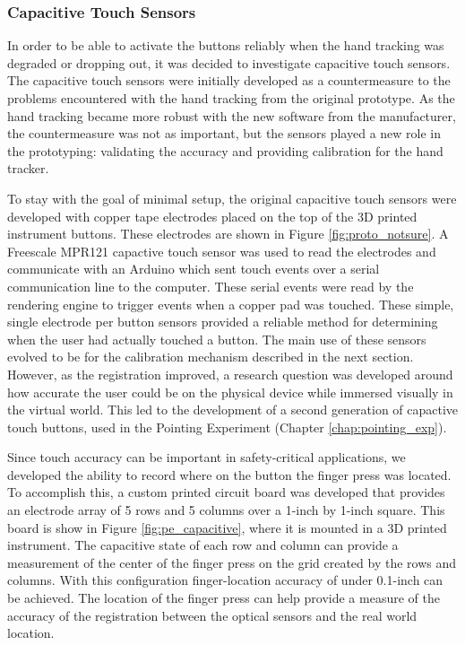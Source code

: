 \subsubsection{Capacitive Touch Sensors}

In order to be able to activate the buttons reliably when the hand tracking was degraded or dropping out, it was decided to investigate capacitive touch sensors.
The capacitive touch sensors were initially developed as a countermeasure to the problems encountered with the hand tracking from the original prototype.
As the hand tracking became more robust with the new software from the manufacturer, the countermeasure was not as important, but the sensors played a new role in the prototyping: validating the accuracy and providing calibration for the hand tracker.

To stay with the goal of minimal setup, the original capacitive touch sensors were developed with copper tape electrodes placed on the top of the 3D printed instrument buttons.
These electrodes are shown in Figure \ref{fig:proto_notsure}.
A Freescale MPR121 capactive touch sensor was used to read the electrodes and communicate with an Arduino which sent touch events over a serial communication line to the computer.
These serial events were read by the rendering engine to trigger events when a copper pad was touched.
These simple, single electrode per button sensors provided a reliable method for determining when the user had actually touched a button.
The main use of these sensors evolved to be for the calibration mechanism described in the next section.
However, as the registration improved, a research question was developed around how accurate the user could be on the physical device while immersed visually in the virtual world.
This led to the development of a second generation of capactive touch buttons, used in the Pointing Experiment (Chapter \ref{chap:pointing_exp}).

Since touch accuracy can be important in safety-critical applications, we developed the ability to record where on the button the finger press was located.
To accomplish this, a custom printed circuit board was developed that provides an electrode array of 5 rows and 5 columns over a 1-inch by 1-inch square.
This board is show in Figure \ref{fig:pe_capacitive}, where it is mounted in a 3D printed instrument.
The capacitive state of each row and column can provide a measurement of the center of the finger press on the grid created by the rows and columns.
With this configuration finger-location accuracy of under 0.1-inch can be achieved.
The location of the finger press can help provide a measure of the accuracy of the registration between the optical sensors and the real world location.

